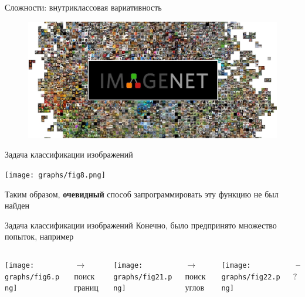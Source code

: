 \documentclass[aspectratio=169]{beamer}
\begin{document}
\begin{frame}{Сложности: внутриклассовая вариативность}
    \begin{figure}
        \includegraphics[width=0.69\linewidth]{graphs/fig20.jpg}
    \end{figure}
\end{frame}

\begin{frame}{Задача классификации изображений}
    \begin{center}
        \texttt{[image: graphs/fig8.png]}
    \end{center}
    Таким образом, \textbf{очевидный} способ запрограммировать эту функцию не
     был найден
\end{frame}

\begin{frame}{Задача классификации изображений}
    Конечно, было предпринято множество попыток, например
    \vfill
    \begin{columns}
        \begin{column}{0.27\linewidth}
            \texttt{[image: graphs/fig6.png]}
        \end{column}
        \pause{}
        \begin{column}{0.1\linewidth}
            \centering
            \( \longrightarrow \) \\
            поиск границ
        \end{column}
        \begin{column}{0.27\linewidth}
            \texttt{[image: graphs/fig21.png]}
        \end{column}
        \pause{}
        \begin{column}{0.1\linewidth}
            \centering
            \( \longrightarrow \) \\
            поиск углов
        \end{column}
        \begin{column}{0.1\linewidth}
            \texttt{[image: graphs/fig22.png]}
        \end{column}
        \pause{}
        \begin{column}{0.05\linewidth}
            \centering
            \( \longrightarrow  \) \\
            \( ? \)
        \end{column}
    \end{columns}
\end{frame}
\end{document}
